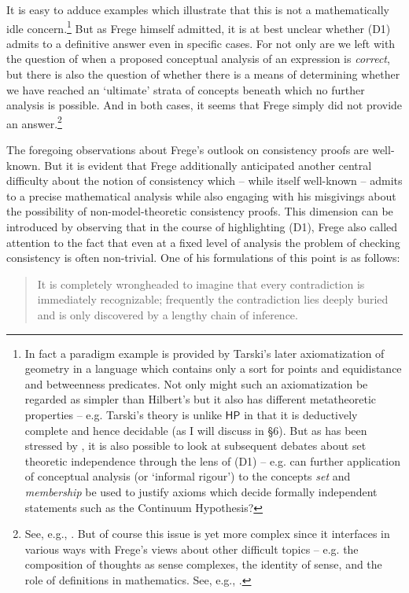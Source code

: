 \documentclass[11pt,fleqn,leqno]{article}
\begin{document}
It is easy to adduce examples which illustrate that this is not a mathematically idle concern.\footnote{In fact a paradigm example is provided by Tarski's \citeyearpar{Tarski1959a} later axiomatization of geometry in a language which contains only a sort for points and equidistance and betweenness predicates.   Not only might such an axiomatization be regarded as simpler than Hilbert's but it also has different metatheoretic properties -- e.g. Tarski's theory is unlike $\mathsf{HP}$ in that it is deductively complete and hence decidable (as I will discuss in \S 6).   But as has been stressed by \citet{Kreisel1967}, it is also possible to look at subsequent debates about set theoretic independence through the lens of (D1) -- e.g. can further application of conceptual analysis (or `informal rigour') to the concepts \textsl{set} and \textsl{membership} be used to justify axioms which decide formally independent statements such as the Continuum Hypothesis?} But as Frege himself admitted,  it is at best unclear whether (D1) admits to a definitive answer even in specific cases.  For not only are we left with the question of when a proposed conceptual analysis of an expression is \textsl{correct}, but there is also the question of whether there is a means of determining whether we have reached an `ultimate' strata of concepts beneath which no further analysis is possible.  And in both cases, it seems that Frege simply did not provide an answer.\footnote{See, e.g., \citeyearpar[p. 209 ff.]{Frege1914a}.  But of course this issue is yet more complex since it interfaces in various ways with Frege's views about other difficult topics -- e.g. the composition of thoughts as sense complexes, the identity of sense, and the role of definitions in mathematics.  See, e.g., \citep[\S 2]{Blanchette2012}.}

The foregoing observations about Frege's outlook on consistency proofs are well-known.  But it is evident that Frege additionally anticipated another central difficulty about the notion of consistency which -- while itself well-known -- admits to a precise mathematical analysis while also engaging with his misgivings about the possibility of non-model-theoretic consistency proofs.   This dimension can be introduced by observing that in the course of highlighting (D1), Frege also called attention to the fact that even at a fixed level of analysis the problem of checking consistency is often non-trivial.  One of his formulations of this point is as follows:
\begin{quote}
{\footnotesize It is completely wrongheaded to imagine that every contradiction is immediately recognizable; frequently the contradiction lies deeply buried and is only discovered by a lengthy chain of inference.\\ \hspace*{1ex} \hfill \citeyearpar[p. 194/179]{Frege1906}}
\end{quote}
\end{document}
